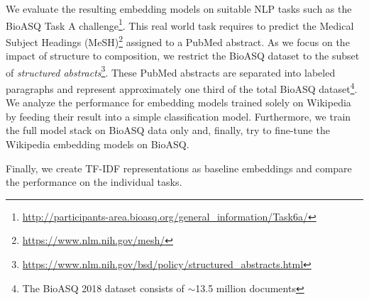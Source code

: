 We evaluate the resulting embedding models on suitable \ac{NLP} tasks such as the BioASQ Task A challenge\footnote{\url{http://participants-area.bioasq.org/general_information/Task6a/}}. This real world task requires to predict the Medical Subject Headings (MeSH)\footnote{\url{https://www.nlm.nih.gov/mesh/}} assigned to a PubMed abstract. As we focus on the impact of structure to composition, we restrict the BioASQ dataset to the subset of \textit{structured abstracts}\footnote{\url{https://www.nlm.nih.gov/bsd/policy/structured_abstracts.html}}. These PubMed abstracts are separated into labeled paragraphs and represent approximately one third of the total BioASQ dataset\footnote{The BioASQ 2018 dataset consists of $\sim$13.5 million documents}. We analyze the performance for embedding models trained solely on Wikipedia by feeding their result into a simple classification model. Furthermore, we train the full model stack on BioASQ data only and, finally, try to fine-tune the Wikipedia embedding models on BioASQ.  

Finally, we create \ac{TF-IDF} representations as baseline embeddings and compare the performance on the individual tasks. 











 



